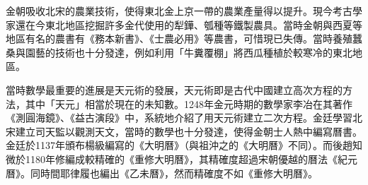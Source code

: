 金朝吸收北宋的農業技術，使得東北金上京一帶的農業產量得以提升。現今考古學家還在今東北地區挖掘許多金代使用的犁鏵、瓠種等鐵製農具。當時金朝與西夏等地區有名的農書有《務本新書》、《士農必用》等農書，可惜現已失傳。當時養殖蠶桑與園藝的技術也十分發達，例如利用「牛糞覆棚」將西瓜種植於較寒冷的東北地區。

當時數學最重要的進展是天元術的發展，天元術即是古代中國建立高次方程的方法，其中「天元」相當於現在的未知數。1248年金元時期的數學家李冶在其著作《測圓海鏡》、《益古演段》中，系統地介紹了用天元術建立二次方程。金廷學習北宋建立司天監以觀測天文，當時的數學也十分發達，使得金朝士人熱中編寫曆書。金廷於1137年頒布楊級編寫的《大明曆》（與祖沖之的《大明曆》不同）。而後趙知微於1180年修編成較精確的《重修大明曆》，其精確度超過宋朝優越的曆法《紀元曆》。同時間耶律履也編出《乙未曆》，然而精確度不如《重修大明曆》。














